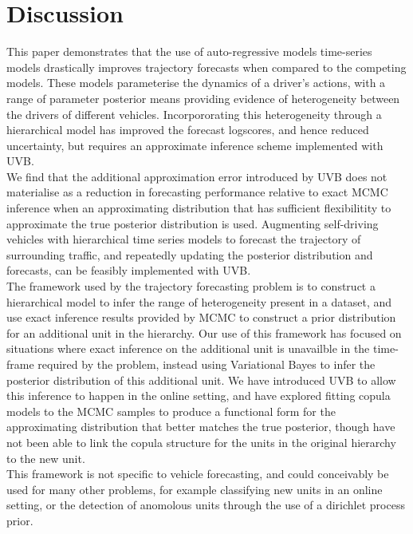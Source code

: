 \documentclass[12pt,a4paper]{article}\usepackage[]{graphicx}\usepackage[]{color}
\begin{document}
{\newpage


\section{Discussion}
\label{sec:disc}
This paper demonstrates that the use of auto-regressive models time-series models drastically improves trajectory forecasts when compared to the competing models.  These models parameterise the dynamics of a driver's actions, with a range of parameter posterior means providing evidence of heterogeneity between the drivers of different vehicles. Incorpororating this heterogeneity through a hierarchical model has improved the forecast logscores, and hence reduced uncertainty, but requires an approximate inference scheme implemented with UVB. 
\\

We find that the additional approximation error introduced by UVB does not materialise as a reduction in forecasting performance relative to exact MCMC inference when an approximating distribution that has sufficient flexibilitity to approximate the true posterior distribution is used. Augmenting self-driving vehicles with hierarchical time series models to forecast the trajectory of surrounding traffic, and repeatedly updating the posterior distribution and forecasts, can be feasibly implemented with UVB.
\\

The framework used by the trajectory forecasting problem is to construct a hierarchical model to infer the range of heterogeneity present in a dataset, and use exact inference results provided by MCMC to construct a prior distribution for an additional unit in the hierarchy. Our use of this framework has focused on situations where exact inference on the additional unit is unavailble in the time-frame required by the problem, instead using Variational Bayes to infer the posterior distribution of this additional unit. We have introduced UVB to allow this inference to happen in the online setting, and have explored fitting copula models to the MCMC samples to produce a functional form for the approximating distribution that better matches the true posterior, though have not been able to link the copula structure for the units in the original hierarchy to the new unit.
\\

This framework is not specific to vehicle forecasting, and could conceivably be used for many other problems, for example classifying new units in an online setting, or the detection of anomolous units through the use of a dirichlet process prior.
\\

}
\end{document}
